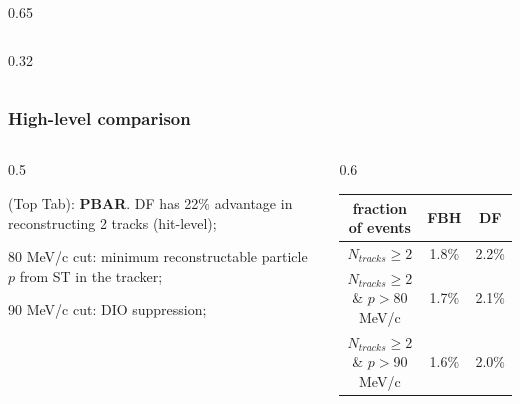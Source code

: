 \documentclass{beamer}
\begin{document}
\begin{frame}
\begin{columns}
\begin{column}{0.65\framewidth}
\begin{columns}
\begin{column}{0.32\framewidth}
\begin{figure}[!h]
       \label{fig:0pbarbefore}
\end{figure}
        \end{column}
    \end{columns}
\end{column}
\end{columns}

       
   
   
\end{frame}

\begin{frame}
    \frametitle{High-level comparison}
    \vspace{-5mm}
     \begin{columns}
    \begin{column}{0.5\framewidth}
    \vspace{-2mm}
        \setlength{\leftmargini}{0.7em}
\begin{itemize}
{\footnotesize
    \item (Top Tab): \textbf{PBAR}. DF has 22\% advantage in reconstructing 2 tracks (hit-level);
            \vspace{-1mm}
\item 80 MeV/c cut: minimum reconstructable particle $p$ from ST in the tracker;
        \vspace{-1mm}
 \item 90 MeV/c cut: DIO suppression;
    }
\end{itemize}
        \end{column}
         \begin{column}{0.6\framewidth}
        \begin{table}[h!]
        \centering
        \hspace*{-0.5em}
        \renewcommand{\arraystretch}{0.7}
           \begin{tabular}{| c | c | c |} 
            \hline
            {\scriptsize fraction of events} &  {\scriptsize FBH } &  {\scriptsize DF}\\
            \hline
              {\scriptsize $N_{tracks} \geq 2$} &   {\scriptsize 1.8\%} &  {\scriptsize 2.2\%}\\
            \hline
             {\scriptsize $N_{tracks} \geq 2$ \& $p>$80 MeV/c} &  {\scriptsize 1.7\%} &  {\scriptsize 2.1\%}\\
            \hline
             {\scriptsize $N_{tracks} \geq 2$ \& $p>$90 MeV/c } &  {\scriptsize 1.6\%} &  {\scriptsize 2.0\%}\\
            \hline
            \end{tabular}

\end{table}
\end{column}
\end{columns}
\end{frame}
\end{document}
